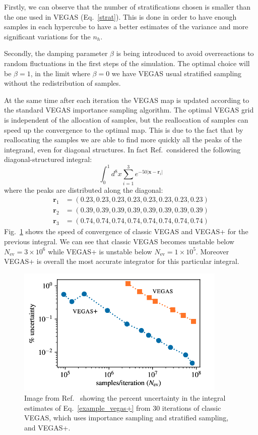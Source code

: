 \documentclass[../main/main.tex]{subfiles}
\begin{document}
Firstly, we can observe that the number of stratifications chosen is smaller than the one used in VEGAS (Eq.~\ref{strat}). This is done in order to
have enough samples in each hypercube to have a better estimates of the variance and more significant variations for the $n_h$. 

Secondly, the damping parameter $\beta$ is being introduced to avoid overreactions to random fluctuations in the first steps of the simulation. The optimal choice will be $\beta=1$, in the limit where $\beta=0$ we have VEGAS usual stratified sampling without the redistribution of samples.

At the same time after each iteration the VEGAS map is updated according to the standard VEGAS importance sampling algorithm. The optimal VEGAS grid is independent of the allocation of samples, but the reallocation of samples can speed up the convergence to the optimal map. This is due to the fact that by reallocating the samples we are able to find more quickly all the peaks of the integrand, even for diagonal structures.
In fact Ref.~\cite{Lepage:2020tgj}considered the following diagonal-structured integral:
\begin{equation}
	\label{example_vegas+}
	\int_0^1 d^8 x \sum_{i=1}^3 e^{-50 |\textbf{x}- \textbf{r}_i|}
\end{equation}
where the peaks are distributed along the diagonal:
\begin{eqnarray*}
	\textbf{r}_1 &= (0.23,0.23,0.23,0.23,0.23,0.23,0.23,0.23)  \\
	\textbf{r}_2 &= (0.39,0.39,0.39,0.39,0.39,0.39,0.39,0.39)  \\
	\textbf{r}_3 &=(0.74,0.74,0.74,0.74,0.74,0.74,0.74,0.74)  
\end{eqnarray*}
Fig.~\ref{vegas_vegas+} shows the speed of convergence of classic VEGAS and VEGAS+ for the previous integral. We can see that classic VEGAS becomes unstable below $N_\text{ev} =3 \times 10^6$ while VEGAS+ is unstable below $N_\text{ev} =1 \times 10^5$. Moreover
VEGAS+ is overall the most accurate integrator for this particular integral.

\begin{figure}[h]
	\centering
	\includegraphics[width=10cm]{../images/VEGAS-VEGAS+.png}
	\caption{Image from Ref.~\cite{Lepage:2020tgj} showing the percent uncertainty in the integral estimates of Eq.~\ref{example_vegas+} from 30 iterations of classic VEGAS, which uses importance sampling and stratified sampling,  and VEGAS+.}
	\label{vegas_vegas+}
\end{figure}
\end{document}
